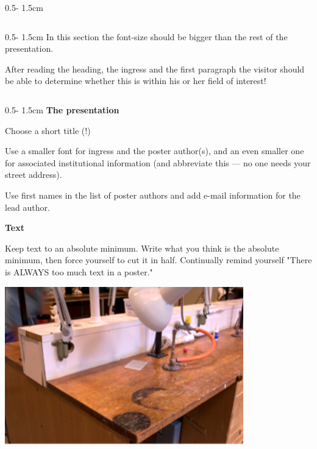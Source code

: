 \documentclass{uibposter}
\begin{document}
\begin{frame}
\begin{columns}
\begin{column}{0.5\textwidth - 1.5cm}
\begin{column}{0.5\textwidth - 1.5cm}
In this section the font-size should be bigger than the rest of the presentation.
\vspace{0.2cm}

After reading the heading, the ingress and the first paragraph the visitor should be able to determine whether this is within his or her field of interest!
    \end{column}
    \begin{column}{0.5\textwidth - 1.5cm}
        \textbf{The presentation}
\vspace{0.5cm}

        Choose a short title (!)
\vspace{0.5cm}

        Use a smaller font for ingress and the poster author(s), and an even smaller one for associated institutional information (and abbreviate this — no one needs your street address).
\vspace{0.2cm}

        Use first names in the list of poster authors and add e-mail information for the lead author.
\vspace{0.5cm}

        \textbf{Text}
\vspace{0.5cm}

        Keep text to an absolute minimum. Write what you think is the absolute minimum, then force yourself to cut it in half.  Continually remind yourself "There is ALWAYS too much text in a poster."
        \vspace{0.5cm}

        \includegraphics[width = \textwidth]{uibposter-images/bilde2.png}
        \vspace{0.5cm}


\end{column}
\end{column}
\end{columns}
\end{frame}
\end{document}
